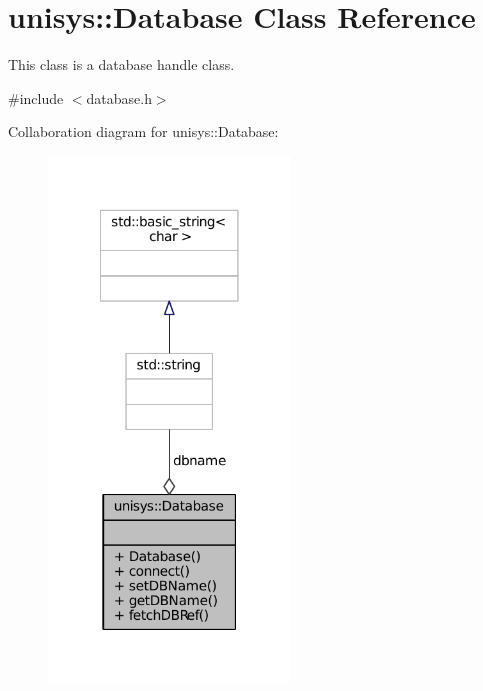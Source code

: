 \hypertarget{classunisys_1_1Database}{\section{unisys\-:\-:Database Class Reference}
\label{classunisys_1_1Database}
}


This class is a database handle class.  




{\ttfamily \#include $<$database.\-h$>$}



Collaboration diagram for unisys\-:\-:Database\-:
\nopagebreak
\begin{figure}[H]
\begin{center}
\leavevmode
\includegraphics[width=182pt]{classunisys_1_1Database__coll__graph}
\end{center}
\end{figure}
